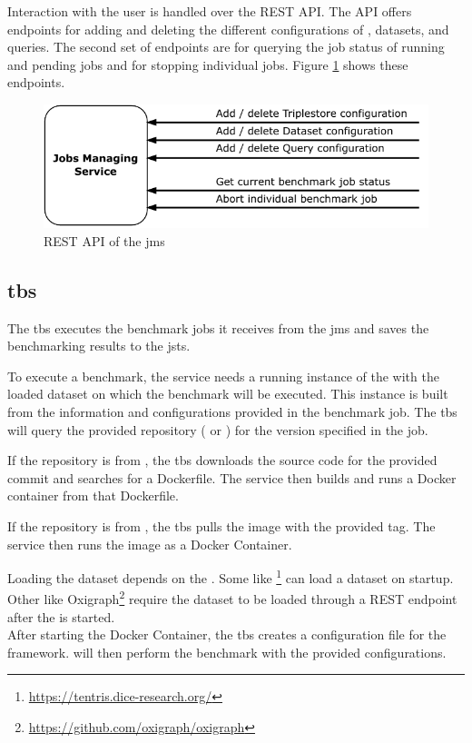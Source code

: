 Interaction with the user is handled over the REST API.
The API offers endpoints for adding and deleting the different configurations of \tsp{}, datasets, and queries.
The second set of endpoints are for querying the job status of running and pending jobs and for stopping individual jobs.
Figure \ref{fig:rest_apis_approach_jms} shows these endpoints.
\begin{figure}[tbph]
	\centering
	\includegraphics[width=.57\textwidth]{figures/rest-apis-approach-jms.pdf}
	\caption{REST API of the \acl{jms}}
	\label{fig:rest_apis_approach_jms}
\end{figure}


\subsection{\acl{tbs}}
\label{sec:ts_benchmarking_service}
The \acf{tbs} executes the benchmark jobs it receives from the \ac{jms} and saves the benchmarking results to the \acl*{jsts}.

To execute a benchmark, the service needs a running instance of the \ts{} with the loaded dataset on which the benchmark will be executed.
This instance is built from the information and configurations provided in the benchmark job.
The \ac{tbs} will query the provided repository (\gh{} or \dockh{}) for the version specified in the job.

If the repository is from \gh{}, the \ac{tbs} downloads the source code for the provided commit and searches for a Dockerfile.
The service then builds and runs a Docker container from that Dockerfile.

If the repository is from \dockh{}, the \ac{tbs} pulls the image with the provided tag.
The service then runs the image as a Docker Container.

Loading the dataset depends on the \ts{}.
Some \tsp{} like \tentris{}\footnote{\url{https://tentris.dice-research.org/}} can load a dataset on startup.
Other \tsp{} like Oxigraph\footnote{\url{https://github.com/oxigraph/oxigraph}} require the dataset to be loaded through a REST endpoint after the \ts{} is started.
\\

After starting the Docker Container, the \ac{tbs} creates a configuration file for the \iguana{} framework.
\iguana{} will then perform the benchmark with the provided configurations.

